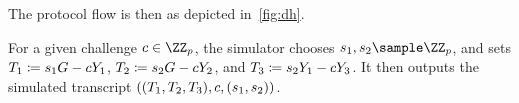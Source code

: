 \documentclass[11pt]{article}
\begin{document}
The protocol flow is then as depicted in~\cref{fig:dh}.

For a given challenge $c\in\ZZ_p$, the simulator chooses $s_1,s_2\sample\ZZ_p$, and sets $T_1\coloneqq s_1G -cY_1$, $T_2\coloneqq s_2G-cY_2$, and $T_3\coloneqq s_2Y_1-cY_3$.
It then outputs the simulated transcript $((T_1,T_2,T_3),c,(s_1,s_2))$.
\end{document}
